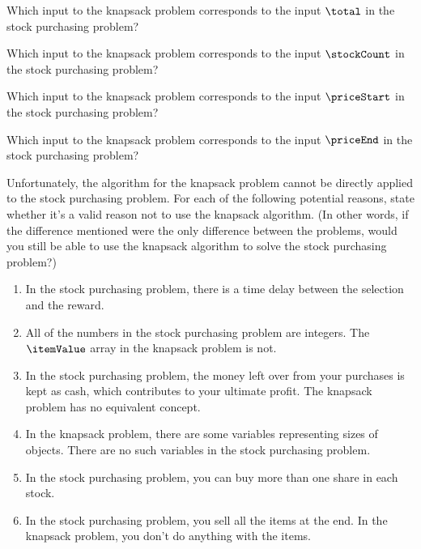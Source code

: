 \documentclass[12pt,twoside]{article}
\newcommand{\answerIId}{\solution{
4. capacity
}}
\newcommand{\answerIIe}{\solution{
1. items
}}
\newcommand{\answerIIf}{\solution{
2. size
}}
\newcommand{\answerIIg}{\solution{
3. value
}}
\begin{document}
\begin{problems}
{}

\begin{problemparts}

\problempart
{}
Which input to the knapsack problem
corresponds to the input $\total$ in the stock purchasing problem?
\knapsackAnswers
\answerIId

\problempart
{}
Which input to the knapsack problem
corresponds to the input $\stockCount$ in the stock purchasing problem?
\knapsackAnswers
\answerIIe

\problempart
{}
Which input to the knapsack problem
corresponds to the input $\priceStart$ in the stock purchasing problem?
\knapsackAnswers
\answerIIf

\problempart
{}
Which input to the knapsack problem
corresponds to the input $\priceEnd$ in the stock purchasing problem?
\knapsackAnswers
\answerIIg

\problempart
{}
Unfortunately,
the algorithm for the knapsack problem
cannot be directly applied to the stock purchasing problem.
For each of the following potential reasons,
state whether it's a valid reason
not to use the knapsack algorithm.
(In other words, if the difference mentioned
were the only difference between the problems,
would you still be able to use the knapsack algorithm
to solve the stock purchasing problem?)

\begin{enumerate}
\item
In the stock purchasing problem,
there is a time delay between the selection
and the reward.

\item
All of the numbers in the stock purchasing problem are integers.
The $\itemValue$ array in the knapsack problem is not.

\item 
In the stock purchasing problem,
the money left over from your purchases
is kept as cash,
which contributes to your ultimate profit.
The knapsack problem has no equivalent concept.

\item
In the knapsack problem,
there are some variables representing
sizes of objects.
There are no such variables
in the stock purchasing problem.

\item
In the stock purchasing problem,
you can buy more than one share in each stock.

\item
In the stock purchasing problem,
you sell all the items at the end.
In the knapsack problem,
you don't do anything with the items.
 

\end{enumerate}
\end{problemparts}
\end{problems}
\end{document}
